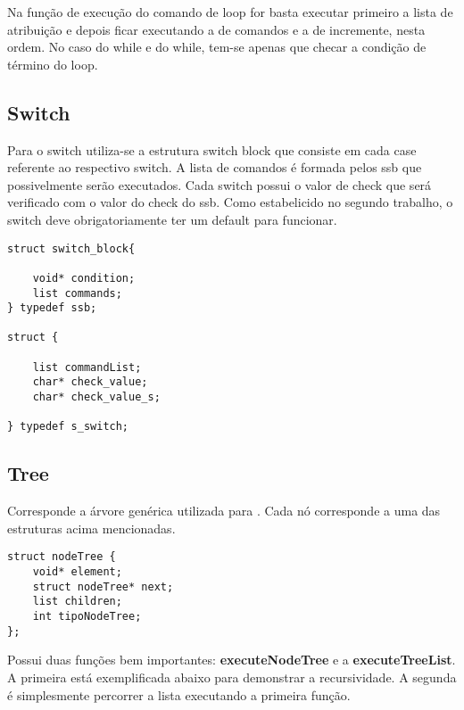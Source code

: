 \documentclass[a4paper,10pt]{article}
\begin{document}
Na função de execução do comando de loop for basta executar primeiro a lista de atribuição e depois ficar executando a de comandos e a de incremente, nesta ordem. No caso do while e do while, tem-se apenas que checar a condição de término do loop.

\subsection{Switch}

Para o switch utiliza-se a estrutura switch block que consiste em cada case referente ao respectivo switch. A lista de comandos é formada pelos ssb que possivelmente serão executados.
Cada switch possui o valor de check que será verificado com o valor do check do ssb. Como estabelicido no segundo trabalho, o switch deve obrigatoriamente ter um default para funcionar.

\begin{lstlisting}
struct switch_block{

    void* condition;
    list commands;
} typedef ssb;

struct {

	list commandList;
	char* check_value;
    char* check_value_s;

} typedef s_switch;
\end{lstlisting}

\subsection{Tree}
Corresponde a árvore genérica utilizada para . Cada nó corresponde a uma das estruturas acima mencionadas.
\begin{lstlisting}
struct nodeTree {
	void* element;
	struct nodeTree* next;
	list children;
	int tipoNodeTree;
};
\end{lstlisting}

Possui duas funções bem importantes: \textbf{executeNodeTree} e a \textbf{executeTreeList}. A primeira está exemplificada abaixo para demonstrar a recursividade. A segunda é simplesmente percorrer a lista executando a primeira função.
\end{document}
